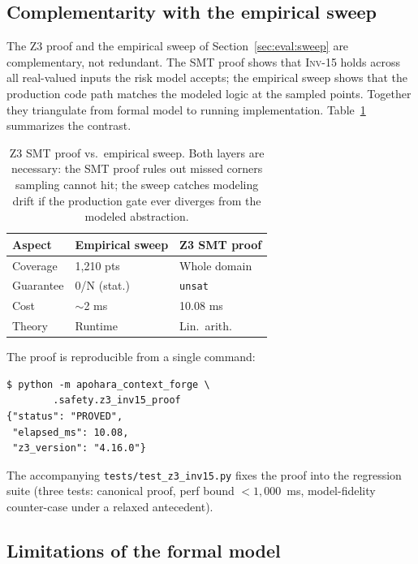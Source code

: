 \documentclass[10pt,twocolumn]{article}
\newcommand{\INV}[1]{\textsc{Inv-#1}}
\newcommand{\code}[1]{\texttt{\small #1}}
\begin{document}
\subsection{Complementarity with the empirical sweep}
\label{ssec:z3-complementarity}

The Z3 proof and the empirical sweep of
Section~\ref{sec:eval:sweep} are complementary, not redundant. The
SMT proof shows that \INV{15} holds across all real-valued inputs
the risk model accepts; the empirical sweep shows that the
production code path matches the modeled logic at the sampled
points. Together they triangulate from formal model to running
implementation. Table~\ref{tab:z3-vs-sweep} summarizes the
contrast.

\begin{table}[t]
  \centering
  \scriptsize
  \caption{Z3 SMT proof vs.\ empirical sweep. Both layers are
           necessary: the SMT proof rules out missed corners
           sampling cannot hit; the sweep catches modeling drift
           if the production gate ever diverges from the modeled
           abstraction.}
  \label{tab:z3-vs-sweep}
  \begin{tabular}{@{}lll@{}}
    \toprule
    Aspect & Empirical sweep & Z3 SMT proof \\
    \midrule
    Coverage    & 1{,}210 pts   & Whole domain \\
    Guarantee   & 0/N (stat.)   & \texttt{unsat} \\
    Cost        & $\sim$2 ms    & 10.08 ms \\
    Theory      & Runtime       & Lin.\ arith. \\
    \bottomrule
  \end{tabular}
\end{table}

The proof is reproducible from a single command:
\begin{verbatim}
$ python -m apohara_context_forge \
        .safety.z3_inv15_proof
{"status": "PROVED",
 "elapsed_ms": 10.08,
 "z3_version": "4.16.0"}
\end{verbatim}
The accompanying \code{tests/test\_z3\_inv15.py} fixes the proof
into the regression suite (three tests: canonical proof, perf bound
$<\!1{,}000$~ms, model-fidelity counter-case under a relaxed
antecedent).

\subsection{Limitations of the formal model}
\label{ssec:z3-limitations}
\end{document}
